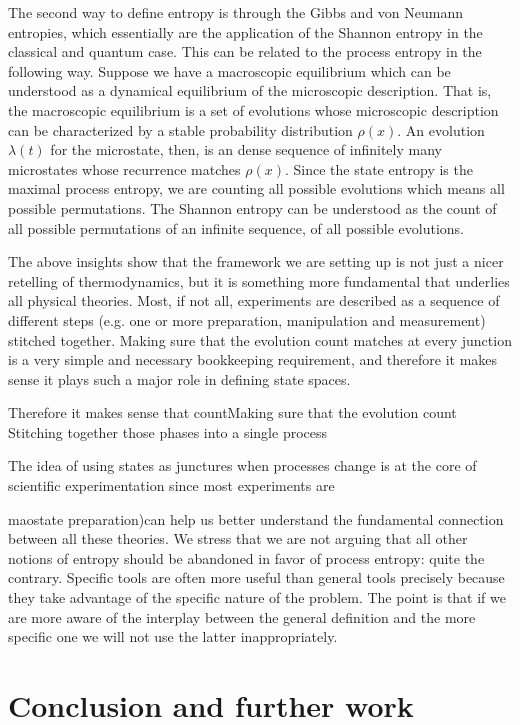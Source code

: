 \documentclass[letterpaper,twocolumn]{article}
\begin{document}
The second way to define entropy is through the Gibbs and von Neumann entropies, which essentially are the application of the Shannon entropy in the classical and quantum case. This can be related to the process entropy in the following way. Suppose we have a macroscopic equilibrium which can be understood as a dynamical equilibrium of the microscopic description. That is, the macroscopic equilibrium is a set of evolutions whose microscopic description can be characterized by a stable probability distribution $\rho(x)$. An evolution $\lambda(t)$ for the microstate, then, is an dense sequence of infinitely many microstates whose recurrence matches $\rho(x)$. Since the state entropy is the maximal process entropy, we are counting all possible evolutions which means all possible permutations. The Shannon entropy can be understood as the count of all possible permutations of an infinite sequence, of all possible evolutions.

The above insights show that the framework we are setting up is not just a nicer retelling of thermodynamics, but it is something more fundamental that underlies all physical theories. Most, if not all, experiments are described as a sequence of different steps (e.g. one or more preparation, manipulation and measurement) stitched together. Making sure that the evolution count matches at every junction is a very simple and necessary bookkeeping requirement, and therefore it makes sense it plays such a major role in defining state spaces.


Therefore it makes sense that countMaking sure that the evolution count  Stitching together those phases into a single process 

The idea of using states as junctures when processes change is at the core of scientific experimentation since most experiments are 


 maostate preparation)can help us better understand the fundamental connection between all these theories. We stress that we are not arguing that all other notions of entropy should be abandoned in favor of process entropy: quite the contrary. Specific tools are often more useful than general tools precisely because they take advantage of the specific nature of the problem. The point is that if we are more aware of the interplay between the general definition and the more specific one we will not use the latter inappropriately.

\section{Conclusion and further work}
\end{document}
